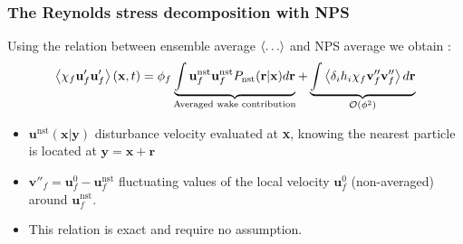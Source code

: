 \documentclass{sintefbeamer}
\begin{document}
\begin{frame}
  \frametitle{The Reynolds stress decomposition with NPS}
  Using the relation between ensemble average $\left<\ldots\right>$ and NPS average we obtain :
  \begin{equation*}
    \left<\chi_f \textbf{u}'_f\textbf{u}'_f\right>(\textbf{x},t)
    = \phi_f
    \underbrace{\int 
      \textbf{u}^\text{nst}_f
      \textbf{u}^\text{nst}_f 
      P_\text{nst}(\textbf{r}|\textbf{x}) d\textbf{r} 
    }_\text{Averaged wake contribution}
    + \underbrace{ 
      \int \left<\delta_i h_i \chi_f \textbf{v}_f''\textbf{v}_f''\right>  d\textbf{r}
    }_{\mathcal{O}(\phi^2)}
  \end{equation*}

\begin{itemize}
  \item $\textbf{u}^\text{nst}(\textbf{x}|\textbf{y})$ disturbance velocity evaluated at \textbf{x}, knowing the nearest particle is located at $\textbf{y} = \textbf{x}+\textbf{r}$
  \item $\textbf{v}''_f = \textbf{u}^0_f - \textbf{u}^\text{nst}_f$ fluctuating values of the local velocity $\textbf{u}_f^0$ (non-averaged) around $\textbf{u}_f^\text{nst}$.
  \item This relation is exact and require no assumption. 
\end{itemize}
\end{frame}
\end{document}
